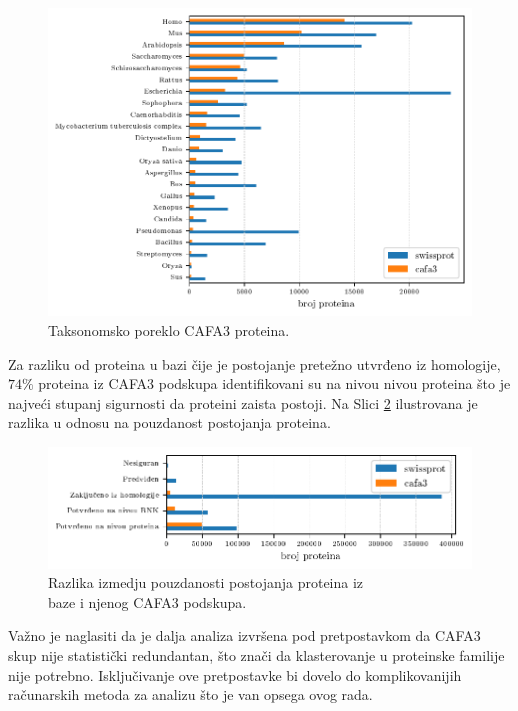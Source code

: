 \begin{figure}[th]
\centering
\hspace*{-3.0cm} 
\includegraphics[]{plots/sp_vs_cafa3}
\caption{Taksonomsko poreklo CAFA3 proteina. \\ \footnotesize 
}
\label{fig:sp_vs_cafa3}
\end{figure}

Za razliku od proteina u \swissprot bazi čije je postojanje pretežno utvrđeno
iz homologije, $74\%$ proteina iz CAFA3 podskupa identifikovani su na nivou
nivou proteina što je najveći stupanj sigurnosti da proteini zaista postoji. Na
Slici \ref{fig:cafa3_pe} ilustrovana je razlika u odnosu na pouzdanost
postojanja proteina. 



\begin{figure}[th]
\centering
\hspace*{-2.5cm} 
\includegraphics[]{plots/cafa3_pe}
\caption{Razlika izmedju pouzdanosti postojanja proteina iz \\ \swissprot baze i njenog CAFA3 podskupa. }
\label{fig:cafa3_pe}
\end{figure}


Važno je naglasiti da je dalja analiza izvršena pod pretpostavkom da CAFA3 skup
nije statistički redundantan, što znači da klasterovanje u proteinske familije
nije potrebno.  Isključivanje ove pretpostavke bi dovelo do komplikovanijih
računarskih metoda za analizu što je van opsega ovog rada.



